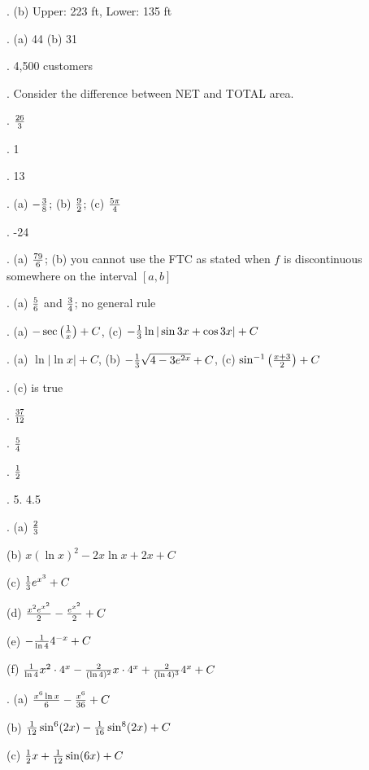 \documentclass[12pt]{article}
\begin{document}
. (b) Upper:  223 ft, Lower: 135 ft

. (a) 44 (b) 31

.  4,500 customers

.  Consider the difference between NET and TOTAL area.

.  ${{26}\over{3}}$ 

.  1 

. 13

. (a) $-{{3}\over{8}}$;  (b) ${{9}\over{2}}$;  (c) ${{5 \pi}\over{4}}$

. -24

. (a) ${{79}\over{6}}$; (b) you cannot use the FTC as stated when $f$ 
is discontinuous somewhere on the interval $[a,b]$

.  (a) ${{5}\over{6}}$ and ${{3}\over{4}}$; no general rule

.  (a) $- \sec \left ( {{1}\over{x}} \right ) + C$, (c) 
$-{{1}\over{3}} \ln |\sin 3x + \cos 3x| + C$

.  (a) $\ln |\ln x| + C$, (b) $-{{1}\over{3}} \sqrt{4-3e^{2x}} 
+ C$, (c) $\sin^{-1} \left ( {{x+3}\over{2}} \right ) + C$

. (c) is true 

. ${{37}\over{12}}$ 

. ${{5}\over{4}}$ 

. ${{1}\over{2}}$ 

. 5. 4.5

. (a) ${{2}\over{3}}$

\noindent (b) $x (\ln x)^2 - 2x \ln x + 2x + C$ 

\noindent (c) ${{1}\over{3}} e^{x^3} + C$

\noindent (d) ${{x^2 e^{x^2}}\over{2}} - {{e^{x^2}}\over{2}} + C$

\noindent (e) $-{{1}\over{\ln 4}} 4^{-x} + C$

\noindent (f) ${{1}\over{\ln 4}} x^2 \cdot 4^x - {{2}\over{(\ln 
4)^2}} x \cdot 4^x + {{2}\over{(\ln 4)^3}} 4^x + C$

. (a) ${{x^6 \ln x}\over{6}} - {{x^6}\over{36}} + C$

\noindent (b) ${{1}\over{12}} \sin^6 (2x) -  {{1}\over{16}} \sin^8 (2x) + C$

\noindent (c) ${{1}\over{2}} x + {{1}\over{12}} \sin (6x) + C$
\end{document}
